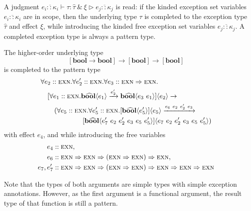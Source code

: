 \documentclass{llncs}
\newcommand{\ThesisPaper}[2]{#2}
\newcommand{\Throws}[2]{#1\langle #2\rangle}    %
\newcommand{\ExnTy}{\widehat\tau}
\newcommand{\ExnTyBool}{\mathrm{b\widehat{oo}l}}    %
\newcommand{\ExnTyList}[2]{\left[\Throws{#1}{#2}\right]\!}
\newcommand{\ExnTyForall}[3]{\forall #1 :: #2. #3}
\newcommand{\Exn}{\xi}
\newcommand{\ExnVar}{e}
\newcommand{\ExnBool}{\mathbf{b\widehat{oo}l}}      %
\newcommand{\Kind}{\kappa}                          %
\newcommand{\KindEXN}{\textsc{exn}}
\newcommand{\KindArr}{\Rightarrow}
\newcommand{\KindEnv}[1]{{\overline{\ExnVar_{#1} :: \Kind_{#1}}}}
\newcommand{\JudgeComplete}[5]{{#1 \vdash #2 : #3\ \&\ #4 \triangleright #5}}
\newcommand{\Ty}{\tau}
\newcommand{\TyBool}{\mathbf{bool}}
\newcommand{\TyList}[1]{\left[#1\right]}
\newcommand{\TyArr}[2]{#1 \to #2}
\begin{document}
A judgment $\JudgeComplete{\KindEnv{i}}{\Ty}{\ExnTy}{\Exn}{\KindEnv{j}}$ is read: if the kinded exception set variables $\KindEnv{i}$ are in scope, then the underlying type $\Ty$ is completed to the exception type $\ExnTy$ and effect $\Exn$, while introducing the kinded free exception set variables $\KindEnv{j}$.
A completed exception type is always a pattern type.

\begin{example} The higher-order underlying type \[ \TyArr{\TyList{\TyArr{\TyBool}{\TyBool}}}{\TyArr{\TyList{\TyBool}}{\TyList{\TyBool}}} \] is completed to the pattern type
    \begin{align*}
        &    {\ExnTyForall{\ExnVar_2}{\KindEXN}{\ExnTyForall{\ExnVar_2^\prime}{\KindEXN}{\ExnTyForall{\ExnVar_3}{\KindEXN\KindArr\KindEXN}{}}}} \\
        & \quad \Throws{[\ExnTyForall{\ExnVar_1}{\KindEXN}{\Throws{\ExnBool}{\ExnVar_1}\xrightarrow{\ExnVar_2^\prime}\Throws{\ExnBool}{\ExnVar_3\ \ExnVar_1}}]}{\ExnVar_2} \to \\
        & \quad\quad (\ExnTyForall{\ExnVar_5}{\KindEXN}{\ExnTyForall{\ExnVar_5^\prime}{\KindEXN}{\Throws{[\Throws{\ExnBool}{\ExnVar_5^\prime}]}{\ExnVar_5}}} \xrightarrow{\ExnVar_6\ \ExnVar_2\ \ExnVar_2^\prime\ \ExnVar_3} \\
        & \quad\quad\quad\quad\quad\quad \Throws{\ExnTyList{\ExnBool}{\ExnVar_7^\prime\ \ExnVar_2\ \ExnVar_2^\prime\ \ExnVar_3\ \ExnVar_5\ \ExnVar_5^\prime}}{\ExnVar_7\ \ExnVar_2\ \ExnVar_2^\prime\ \ExnVar_3\ \ExnVar_5\ \ExnVar_5^\prime})
    \end{align*}
    with effect $\ExnVar_4$, and while introducing the free \ThesisPaper{exception set}{} variables
    \begin{align*}
        \ExnVar_4  &:: \KindEXN, \\
        \ExnVar_6 &:: \KindEXN\KindArr\KindEXN\KindArr(\KindEXN\KindArr\KindEXN)\KindArr\KindEXN, \\
        \ExnVar_7, \ExnVar_7^\prime &:: \KindEXN\KindArr\KindEXN\KindArr(\KindEXN\KindArr\KindEXN)\KindArr\KindEXN\KindArr\KindEXN\KindArr\KindEXN
    \end{align*}

Note that the types of both arguments are simple types with simple exception annotations. However, as the first argument is a functional argument, the result type of that function is still a pattern.


\end{example}
\end{document}
